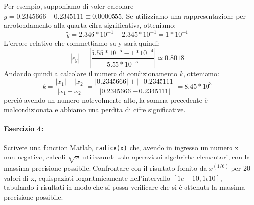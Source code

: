 \documentclass[12pt]{article}
\begin{document}
Per esempio, supponiamo di voler calcolare \(y=0.2345666-0.2345111\equiv 0.0000555\). 
Se utilizziamo una rappresentazione per arrotondamento alla quarta cifra significativa, otteniamo:
$$\tilde{y}=2.346*10^{-1}-2.345*10^{-1} = 1*10^{-4}$$
L'errore relativo che commettiamo su y sarà quindi:
$$|\epsilon_y| = |\frac{5.55*10^{-5}-1*10^{-4}}{5.55*10^{-5}}|\simeq 0.8018$$
Andando quindi a calcolare il numero di condizionamento \(k\), otteniamo:
$$ k=\frac{|x_1|+|x_2|}{|x_1+x_2|}=\frac{|0.2345666|+|-0.2345111|}{|0.2345666-0.2345111|}=8.45*10^3$$
perciò avendo un numero notevolmente alto, la somma precedente è malcondizionata e abbiamo una perdita di cifre significative. 
\paragraph{Esercizio 4:}Scrivere una function Matlab, \texttt{radice(x)} che, avendo in ingresso un numero x non negativo, 
calcoli \(\sqrt[6]{x}\) utilizzando solo operazioni algebriche elementari, con la massima precisione possibile. Confrontare con il risultato fornito da 
\(x^{(1/6)}\) per 20 valori di x, equispaziati logaritmicamente nell’intervallo \([1e-10,1e10]\), tabulando i risultati in modo che si possa verificare che si è ottenuta la massima precisione possibile.
\end{document}
